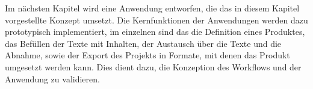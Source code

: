 \begin{samepage}

\secbar

Im nächsten Kapitel wird eine Anwendung entworfen, die das in diesem Kapitel vorgestellte Konzept umsetzt. Die Kernfunktionen der Anwendungen werden dazu prototypisch implementiert, im einzelnen sind das die Definition eines Produktes, das Befüllen der Texte mit Inhalten, der Austausch über die Texte und die Abnahme, sowie der Export des Projekts in Formate, mit denen das Produkt umgesetzt werden kann. Dies dient dazu, die Konzeption des Workflows und der Anwendung zu validieren. 

\end{samepage}

\pagebreak